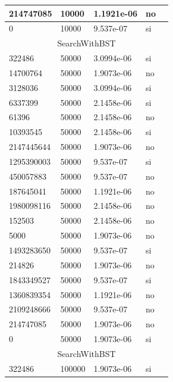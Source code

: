 \documentclass[12pt, fleqn]{article}                             %
\theoremstyle{break}                                            %
\begin{document}
\begin{longtable}{|m{5em}|m{5em}|m{10em}|m{5em}|@{}m{0pt}@{}}
            214747085& 10000  & 1.1921e-06 & no &\\[1em]    \hline
            0& 10000  & 9.537e-07 & si &\\[1em]    \hline
            \multicolumn{5}{|c|}{SearchWithBST}   \\          \hline
            322486& 50000  & 3.0994e-06 & si &\\[1em]    \hline
            14700764& 50000  & 1.9073e-06 & no &\\[1em]    \hline
            3128036& 50000  & 3.0994e-06 & si &\\[1em]    \hline
            6337399& 50000  & 2.1458e-06 & si &\\[1em]    \hline
            61396& 50000  & 2.1458e-06 & no &\\[1em]    \hline
            10393545& 50000  & 2.1458e-06 & si &\\[1em]    \hline
            2147445644& 50000  & 1.9073e-06 & no &\\[1em]    \hline
            1295390003& 50000  & 9.537e-07 & si &\\[1em]    \hline
            450057883& 50000  & 9.537e-07 & no &\\[1em]    \hline
            187645041& 50000  & 1.1921e-06 & no &\\[1em]    \hline
            1980098116& 50000  & 2.1458e-06 & no &\\[1em]    \hline
            152503& 50000  & 2.1458e-06 & no &\\[1em]    \hline
            5000& 50000  & 1.9073e-06 & no &\\[1em]    \hline
            1493283650& 50000  & 9.537e-07 & si &\\[1em]    \hline
            214826& 50000  & 1.9073e-06 & no &\\[1em]    \hline
            1843349527& 50000  & 9.537e-07 & si &\\[1em]    \hline
            1360839354& 50000  & 1.1921e-06 & no &\\[1em]    \hline
            2109248666& 50000  & 9.537e-07 & no &\\[1em]    \hline
            214747085& 50000  & 1.9073e-06 & no &\\[1em]    \hline
            0& 50000  & 1.9073e-06 & si &\\[1em]    \hline
            \multicolumn{5}{|c|}{SearchWithBST}   \\          \hline
            322486& 100000  & 1.9073e-06 & si &\\[1em]    \hline

\end{longtable}
\end{document}
